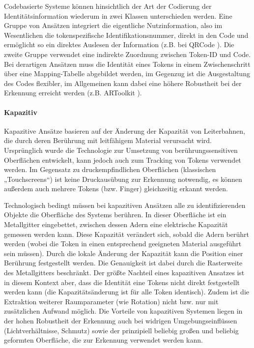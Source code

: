 Codebasierte Systeme können hinsichtlich der Art der Codierung der Identitätsinformation wiederum in zwei Klassen unterschieden werden. Eine Gruppe von Ansätzen integriert die eigentliche Nutzinformation, also im Wesentlichen die tokenspezifische Identifikationsnummer, direkt in den Code und ermöglicht so ein direktes Auslesen der Information (z.B. bei QRCode \citep{QR2008}). Die zweite Gruppe verwendet eine indirekte Zuordnung zwischen Token-ID und Code. Bei derartigen Ansätzen muss die Identität eines Tokens in einem Zwischenschritt über eine Mapping-Tabelle abgebildet werden, im Gegenzug ist die Ausgestaltung des Codes flexibler, im Allgemeinen kann dabei eine höhere Robustheit bei der Erkennung erreicht werden (z.B. ARToolkit \citep{Kato00}).


\paragraph{Kapazitiv} %
\label{par:kapazitiv}

Kapazitive Ansätze basieren auf der Änderung der Kapazität von Leiterbahnen, die durch deren Berührung mit leitfähigem Material verursacht wird. Ursprünglich wurde die Technologie zur Umsetzung von berührungssensitiven Oberflächen entwickelt, kann jedoch auch zum Tracking von Tokens verwendet werden. Im Gegensatz zu druckempfindlichen Oberflächen (klassischen „Touchscreens“) ist keine Druckausübung zur Erkennung notwendig, es können außerdem auch mehrere Tokens (bzw. Finger) gleichzeitig erkannt werden.

Technologisch bedingt müssen bei kapazitiven Ansätzen alle zu identifizierenden Objekte die Oberfläche des Systems berühren. In dieser Oberfläche ist ein Metallgitter eingebettet, zwischen dessen Adern eine elektrische Kapazität gemessen werden kann. Diese Kapazität verändert sich, sobald die Adern berührt werden (wobei die Token in einen entsprechend geeigneten Material ausgeführt sein müssen). Durch die lokale Änderung der Kapazität kann die Position einer Berührung festgestellt werden. Die Genauigkeit ist dabei durch die Rasterweite des Metallgitters beschränkt. Der größte Nachteil eines kapazitiven Ansatzes ist in diesem Kontext aber, dass die Identität eine Tokens nicht direkt festgestellt werden kann (die Kapazitätsänderung ist für alle Token identisch). Zudem ist die Extraktion weiterer Raumparameter (wie Rotation) nicht bzw. nur mit zusätzlichen Aufwand möglich. Die Vorteile von kapazitiven Systemen liegen in der hohen Robustheit der Erkennung auch bei widrigen Umgebungseinflüssen (Lichtverhältnisse, Schmutz) sowie der prinzipiell beliebig großen und beliebig geformten Oberfläche, die zur Erkennung verwendet werden kann.


